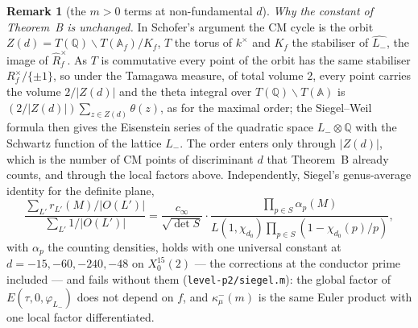 \documentclass[11pt,reqno]{amsart}
\theoremstyle{plain}
\theoremstyle{definition}
\newtheorem{remark}[theorem]{Remark}
\newcommand{\Q}{\mathbb{Q}}
\newcommand{\Lm}{L_{-}}
\begin{document}
\begin{remark}[the $m>0$ terms at non-fundamental $d$]
\emph{Why the constant of Theorem~B is unchanged.} In Schofer's argument the CM cycle is the orbit
$Z(d)=T(\Q)\backslash T(\mathbb A_f)/K_f$, $T$ the torus of $k^\times$ and $K_f$ the stabiliser of
$\widehat{\Lm}$, the image of $\widehat R_f^\times$. As $T$ is commutative every point of the orbit
has the same stabiliser $R_f^\times/\{\pm1\}$, so under the Tamagawa measure, of total volume $2$,
every point carries the volume $2/\lvert Z(d)\rvert$ and the theta integral over $T(\Q)\backslash
T(\mathbb A)$ is $(2/\lvert Z(d)\rvert)\sum_{z\in Z(d)}\theta(z)$, as for the maximal order; the
Siegel--Weil formula then gives the Eisenstein series of the quadratic space $\Lm\otimes\Q$ with the
Schwartz function of the lattice $\Lm$. The order enters only through $\lvert Z(d)\rvert$, which is
the number of CM points of discriminant $d$ that Theorem~B already counts, and through the local
factors above. Independently, Siegel's genus-average identity for the definite plane,
\[
  \frac{\sum_{L'}r_{L'}(M)/\lvert O(L')\rvert}{\sum_{L'}1/\lvert O(L')\rvert}
  =\frac{c_\infty}{\sqrt{\det S}}\cdot\frac{\prod_{p\in S}\alpha_p(M)}{L(1,\chi_{d_0})\prod_{p\in S}(1-\chi_{d_0}(p)/p)},
\]
with $\alpha_p$ the counting densities, holds with one universal constant at $d=-15,-60,-240,-48$
on $X_0^{15}(2)$ --- the corrections at the conductor prime included --- and fails without them
(\texttt{level-p2/siegel.m}): the global factor of $E(\tau,0,\varphi_{\Lm})$ does not depend on
$f$, and $\kappa^-_\mu(m)$ is the same Euler product with one local factor differentiated.
\end{remark}
\end{document}
